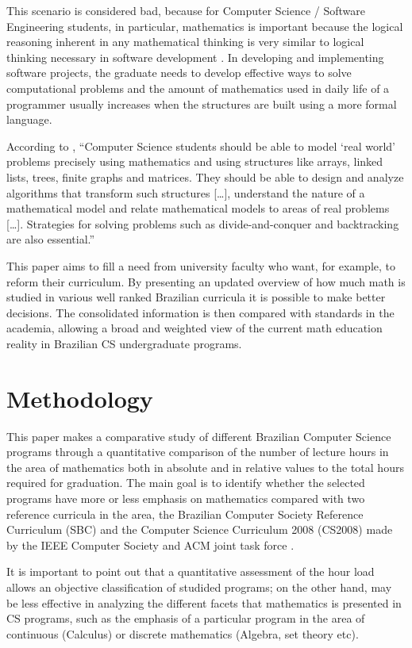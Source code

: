 \documentclass[conference]{IEEEtran}
\begin{document}
	This scenario is considered bad, because for Computer Science / Software Engineering students, in particular, mathematics is important because the logical reasoning inherent in any mathematical thinking is very similar to logical thinking necessary in software development \cite{ralston:do_need_mathematics}. In developing and implementing software projects, the graduate needs to develop effective ways to solve computational problems and the amount of mathematics used in daily life of a programmer usually increases when the structures are built using a more formal language. \cite{ralston:do_need_mathematics}

	According to \cite{kelemen:has_become_math_phobic}, ``Computer Science students should be able to model `real world' problems precisely using mathematics and using structures like arrays, linked lists, trees, finite graphs and matrices. They should be able to design and analyze algorithms that transform such structures [\ldots], understand the nature of a mathematical model and relate mathematical models to areas of real problems [\ldots]. Strategies for solving problems such as divide-and-conquer and backtracking are also essential.''

	This paper aims to fill a need from university faculty who want, for example, to reform their curriculum. By presenting an updated overview of how much math is studied in various well ranked Brazilian curricula it is possible to make better decisions. The consolidated information is then compared with standards in the academia, allowing a broad and weighted view of the current math education reality in Brazilian CS undergraduate programs.
	
\section{Methodology}
	This paper makes a comparative study of different Brazilian Computer Science programs through a quantitative comparison of the number of lecture hours in the area of mathematics both in absolute and in relative values to the total hours required for graduation. The main goal is to identify whether the selected programs have more or less emphasis on mathematics compared with two reference curricula in the area, the Brazilian Computer Society Reference Curriculum (SBC) \cite{sbc} and the Computer Science Curriculum 2008 (CS2008) made by the IEEE Computer Society and ACM joint task force \cite{cs2008}.

	It is important to point out that a quantitative assessment of the hour load allows an objective classification of studided programs; on the other hand, may be less effective in analyzing the different facets that mathematics is presented in CS programs, such as the emphasis of a particular program in the area of continuous (Calculus) or discrete mathematics (Algebra, set theory etc).
\end{document}
